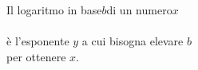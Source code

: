 \documentclass[preview]{standalone}
\begin{document}
\begin{center}
Il logaritmo in base$b$di un numero$x$\\\\è l'esponente $y$ a cui bisogna elevare $b$\\per ottenere $x$.
\end{center}
\end{document}
